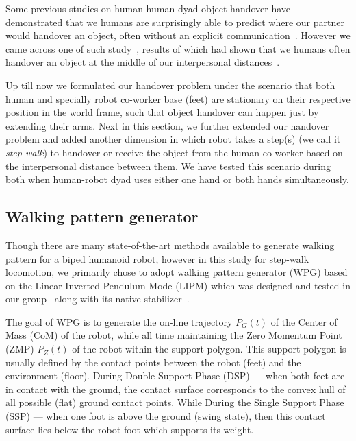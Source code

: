 Some previous studies on human-human dyad object handover have demonstrated that we humans are surprisingly able to predict where our partner would handover an object, often without an explicit communication~\cite{kato2018humans, kato2019handovers}. However we came across one of such study~\cite{hansen2017human}, results of which had shown that we humans often handover an object at the middle of our interpersonal distances~\cite{hall1966proxemic, strabala2013toward}.

Up till now we formulated our handover problem under the scenario that both human and specially robot co-worker base (feet) are stationary on their respective position in the world frame, such that object handover can happen just by extending their arms. Next in this section, we further extended our handover problem and added another dimension in which robot takes a step(s) (we call it \textit{step-walk}) to handover or receive the object from the human co-worker based on the interpersonal distance between them. We have tested this scenario during both when human-robot dyad uses either one hand or both hands simultaneously.


\subsection{Walking pattern generator}

Though there are many state-of-the-art methods available to generate walking pattern for a biped humanoid robot, however in this study for step-walk locomotion, we primarily chose to adopt walking pattern generator (WPG) based on the Linear Inverted Pendulum Mode (LIPM) which was designed and tested in our group~\cite{ kajita20013d, caron2016humanoids} along with its native stabilizer~\cite{kajita2010biped, caron2018stair}. 

The goal of WPG is to generate the on-line trajectory $P_G(t)$ of the Center of Mass (CoM) of the robot, while all time maintaining the Zero Momentum Point (ZMP) $P_Z(t)$ of the robot within the support polygon. This support polygon is usually defined by the contact points between the robot (feet) and the environment (floor). During Double Support Phase (DSP) --- when both feet are in contact with the ground, the contact surface corresponds to the convex hull of all possible (flat) ground contact points. While During the Single Support Phase (SSP) --- when one foot is above the ground (swing state), then this contact surface lies below the robot foot which supports its weight. 


